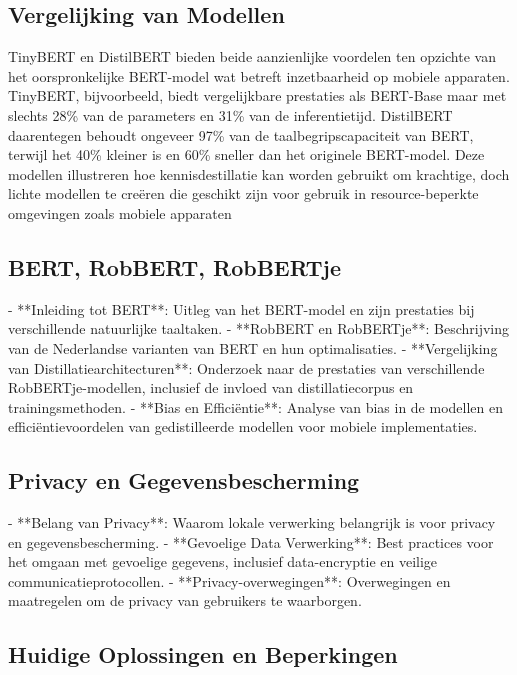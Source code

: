 \subsection{Vergelijking van Modellen}

TinyBERT en DistilBERT bieden beide aanzienlijke voordelen ten opzichte van het oorspronkelijke BERT-model wat betreft inzetbaarheid op mobiele apparaten. TinyBERT, bijvoorbeeld, biedt vergelijkbare prestaties als BERT-Base maar met slechts 28\% van de parameters en 31\% van de inferentietijd. DistilBERT daarentegen behoudt ongeveer 97\% van de taalbegripscapaciteit van BERT, terwijl het 40\% kleiner is en 60\% sneller dan het originele BERT-model. Deze modellen illustreren hoe kennisdestillatie kan worden gebruikt om krachtige, doch lichte modellen te creëren die geschikt zijn voor gebruik in resource-beperkte omgevingen zoals mobiele apparaten \autocite{Sanh2019DistilBERT}


\subsection{ BERT, RobBERT, RobBERTje}

- **Inleiding tot BERT**: Uitleg van het BERT-model en zijn prestaties bij verschillende natuurlijke taaltaken.
- **RobBERT en RobBERTje**: Beschrijving van de Nederlandse varianten van BERT en hun optimalisaties.
- **Vergelijking van Distillatiearchitecturen**: Onderzoek naar de prestaties van verschillende RobBERTje-modellen, inclusief de invloed van distillatiecorpus en trainingsmethoden.
- **Bias en Efficiëntie**: Analyse van bias in de modellen en efficiëntievoordelen van gedistilleerde modellen voor mobiele implementaties.

\subsection{Privacy en Gegevensbescherming}

- **Belang van Privacy**: Waarom lokale verwerking belangrijk is voor privacy en gegevensbescherming.
- **Gevoelige Data Verwerking**: Best practices voor het omgaan met gevoelige gegevens, inclusief data-encryptie en veilige communicatieprotocollen.
- **Privacy-overwegingen**: Overwegingen en maatregelen om de privacy van gebruikers te waarborgen.

\subsection{Huidige Oplossingen en Beperkingen}

